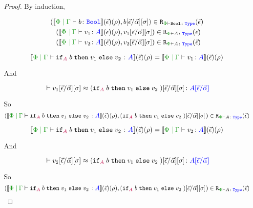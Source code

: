 \begin{proof}
    By induction,
    
    \begin{align*}
        \inLogRelPE{\deno{\gpetyperelation{b}{\B}&}\fundRho}{b\fundSub}{\B}\\
        \inLogRelPE{\deno{\gpetyperelation{v_1}{A}&}\fundRho}{v_1\fundSub}{A}\\
        \inLogRelPE{\deno{\gpetyperelation{v_2}{A}&}\fundRho}{v_2\fundSub}{A}
    \end{align*}
    
    
    \begin{equation}
        \deno{\gpetyperelation{\pifthenelse{A}{b}{v_1}{v_2}}{A}}\fundRho = \deno{\gpetyperelation{v_1}{A}}\fundRho
    \end{equation}
    
    And
    
    \begin{equation}
       \zberelation{ v_1\fundSub}{(\pifthenelse{A}{b}{v_1}{v_2})\fundSub}{A\ssub{\av}{\ev}}
    \end{equation}
    
    So
    \begin{equation}
            \inLogRelPE{\deno{\gpetyperelation{\pifthenelse{A}{b}{v_1}{v_2}}{A}}\fundRho}{(\pifthenelse{A}{b}{v_1}{v_2})\fundSub}{A}
        \end{equation}
    
    
        \begin{equation}
            \deno{\gpetyperelation{\pifthenelse{A}{b}{v_1}{v_2}}{A}}\fundRho = \deno{\gpetyperelation{v_2}{A}}\fundRho
        \end{equation}
        
        And
        
        \begin{equation}
           \zberelation{v_2\fundSub}{(\pifthenelse{A}{b}{v_1}{v_2})\fundSub}{A\ssub{\av}{\ev}}
        \end{equation}
        
        So
        \begin{equation}
                \inLogRelPE{\deno{\gpetyperelation{\pifthenelse{A}{b}{v_1}{v_2}}{A}}\fundRho}{(\pifthenelse{A}{b}{v_1}{v_2})\fundSub}{A}
            \end{equation}
        

\end{proof}
